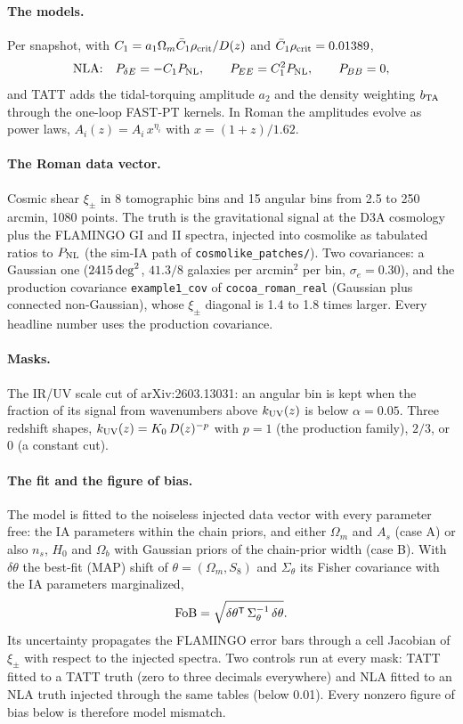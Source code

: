 \documentclass[11pt]{article}
\newcommand{\kuv}{k_{\rm UV}}
\newcommand{\FoB}{{\rm FoB}}
\newcommand{\PNL}{P_{\rm NL}}
\newcommand{\PdE}{P_{\delta E}}
\newcommand{\T}{^{\mathsf{T}}}
\newcommand{\Npts}{1080}
\newcommand{\Alpha}{0.05}
\begin{document}
\paragraph{The models.}
Per snapshot, with $C_1 = a_1 \Omega_m \bar C_1\rho_{\rm crit}/D(z)$
and $\bar C_1\rho_{\rm crit} = 0.01389$,
\begin{equation}
  \text{NLA:}\quad \PdE = -C_1\PNL,\qquad P_{EE} = C_1^2\PNL,\qquad P_{BB} = 0,
\end{equation}
and TATT adds the tidal-torquing amplitude $a_2$ and the density
weighting $b_{\rm TA}$ through the one-loop FAST-PT kernels. In Roman
the amplitudes evolve as power laws, $A_i(z) = A_i\,x^{\eta_i}$ with $x
= (1+z)/1.62$.

\paragraph{The Roman data vector.}
Cosmic shear $\xi_\pm$ in 8 tomographic bins and 15 angular bins from
2.5 to 250 arcmin, \Npts{} points. The truth is the gravitational
signal at the D3A cosmology plus the FLAMINGO GI and II spectra,
injected into cosmolike as tabulated ratios to $\PNL$ (the sim-IA path
of \texttt{cosmolike\_patches/}). Two covariances: a Gaussian one
($2415\,{\rm deg}^2$, $41.3/8$ galaxies per arcmin$^2$ per bin,
$\sigma_e = 0.30$), and the production covariance
\texttt{example1\_cov} of \texttt{cocoa\_roman\_real} (Gaussian plus
connected non-Gaussian), whose $\xi_\pm$ diagonal is 1.4 to 1.8 times
larger. Every headline number uses the production covariance.

\paragraph{Masks.}
The IR/UV scale cut of arXiv:2603.13031: an angular bin is kept when
the fraction of its signal from wavenumbers above $\kuv(z)$ is below
$\alpha = \Alpha$. Three redshift shapes, $\kuv(z) = K_0\,D(z)^{-p}$
with $p = 1$ (the production family), $2/3$, or $0$ (a constant cut).

\paragraph{The fit and the figure of bias.}
The model is fitted to the noiseless injected data vector with every
parameter free: the IA parameters within the chain priors, and either
$\Omega_m$ and $A_s$ (case A) or also $n_s$, $H_0$ and $\Omega_b$ with
Gaussian priors of the chain-prior width (case B). With $\delta\theta$
the best-fit (MAP) shift of $\theta = (\Omega_m, S_8)$ and
$\Sigma_\theta$ its Fisher covariance with the IA parameters
marginalized,
\begin{equation}
  \FoB = \sqrt{\delta\theta\T\,\Sigma_\theta^{-1}\,\delta\theta}.
  \label{eq:fob}
\end{equation}
Its uncertainty propagates the FLAMINGO error bars through a cell
Jacobian of $\xi_\pm$ with respect to the injected spectra. Two
controls run at every mask: TATT fitted to a TATT truth (zero to three
decimals everywhere) and NLA fitted to an NLA truth injected through
the same tables (below 0.01). Every nonzero figure of bias below is
therefore model mismatch.
\end{document}
